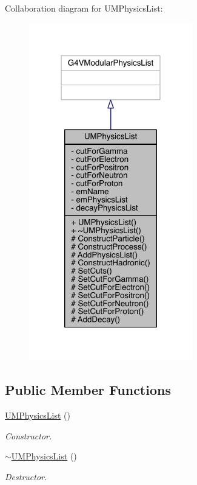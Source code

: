 Collaboration diagram for U\+M\+Physics\+List\+:
\nopagebreak
\begin{figure}[H]
\begin{center}
\leavevmode
\includegraphics[width=202pt]{classUMPhysicsList__coll__graph}
\end{center}
\end{figure}
\subsection*{Public Member Functions}
\begin{DoxyCompactItemize}
\item 
\hyperlink{classUMPhysicsList_a4284f35908bcd0e3553d7c1395e4cc53}{U\+M\+Physics\+List} ()
\begin{DoxyCompactList}\small\item\em Constructor. \end{DoxyCompactList}\item 
\hyperlink{classUMPhysicsList_af84424dc90d68fe791585d18363f6df6}{$\sim$\+U\+M\+Physics\+List} ()
\begin{DoxyCompactList}\small\item\em Destructor. \end{DoxyCompactList}\end{DoxyCompactItemize}
